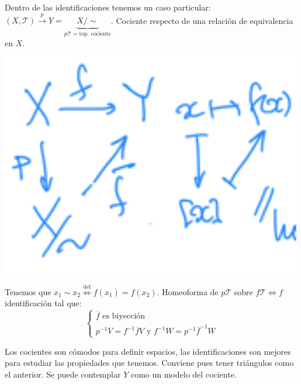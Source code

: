 \begin{defi}[Cociente]
Dentro de las identificaciones tenemos un caso particular: $\left( X, \mathcal{T} \right) \stackrel{p}{\rightarrow} Y = \underbrace{X / \sim}_{p \mathcal{T} = \text{top. cociente}}$. Cociente respecto de una relación de equivalencia en $X$. 
\end{defi}
\begin{center}
    \includegraphics[scale=0.2]{images/def_cociente} 
\end{center}
Tenemos que $x_1 \sim x_2 \stackrel{\text{def}}{\Leftrightarrow} f\left( x_1 \right) = f\left( x_2 \right)$. Homeoforma de $p\mathcal{T}$ sobre $f\mathcal{T} \Leftrightarrow f$ identificación tal que:
\[
\begin{cases}
    \overline{f} \text{ es biyección}\\
    p^{-1}V = f^{-1}\overline{f} V \text{ y } f^{-1}W = p^{-1} \overline{f}^{-1}W
\end{cases} 
\]

\begin{pg}
    Los cocientes son cómodos para definir espacios, las identificaciones son mejores para estudiar las propiedades que tenemos. Conviene pues tener triángulos como el anterior. Se puede contemplar $Y$ como un modelo del cociente.
\end{pg}


